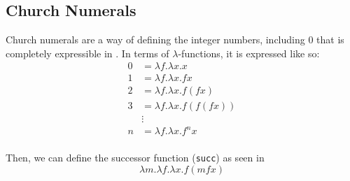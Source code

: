 \subsection{Church Numerals}\label{subsec:Church_Numerals}
Church numerals are a way of defining the integer numbers, including 0 that is completely expressible in .
In terms of $\lambda$-functions, it is expressed like so:
\begin{equation}\label{eq:Church_Numerals}
  \begin{aligned}
    0 &= \lambda f.\lambda x.x \\
    1 &= \lambda f.\lambda x. fx \\
    2 &= \lambda f.\lambda x. f(f x) \\
    3 &= \lambda f.\lambda x. f(f (f x)) \\
    &\vdots \\
    n &= \lambda f. \lambda x. f^{n} x \\
  \end{aligned}
\end{equation}

Then, we can define the successor function (\texttt{succ}) as seen in 
\begin{equation}\label{eq:Church_Numerals_Succ}
  \lambda m. \lambda f. \lambda x. f (m f x)
\end{equation}


